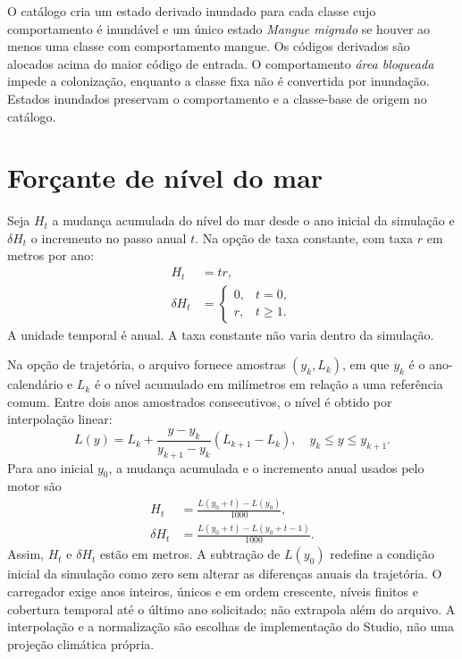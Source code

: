 \documentclass[11pt,a4paper]{article}
\begin{document}
O catálogo cria um estado derivado inundado para cada classe cujo comportamento é inundável e um único estado \textit{Mangue migrado} se houver ao menos uma classe com comportamento mangue. Os códigos derivados são alocados acima do maior código de entrada. O comportamento \textit{área bloqueada} impede a colonização, enquanto a classe fixa não é convertida por inundação. Estados inundados preservam o comportamento e a classe-base de origem no catálogo.

\section{Forçante de nível do mar}

Seja $H_t$ a mudança acumulada do nível do mar desde o ano inicial da simulação e $\delta H_t$ o incremento no passo anual $t$. Na opção de taxa constante, com taxa $r$ em metros por ano:
\begin{align}
H_t &= t r, \label{eq:constant-cumulative}\\
\delta H_t &= 
\begin{cases}
0, & t=0,\\
r, & t\geq 1.
\end{cases} \label{eq:constant-increment}
\end{align}
A unidade temporal é anual. A taxa constante não varia dentro da simulação.

Na opção de trajetória, o arquivo fornece amostras $(y_k,L_k)$, em que $y_k$ é o ano-calendário e $L_k$ é o nível acumulado em milímetros em relação a uma referência comum. Entre dois anos amostrados consecutivos, o nível é obtido por interpolação linear:
\begin{equation}
L(y)=L_k+
\frac{y-y_k}{y_{k+1}-y_k}(L_{k+1}-L_k),
\quad y_k\leq y\leq y_{k+1}.
\label{eq:linear-interpolation}
\end{equation}
Para ano inicial $y_0$, a mudança acumulada e o incremento anual usados pelo motor são
\begin{align}
H_t &= \frac{L(y_0+t)-L(y_0)}{1000}, \label{eq:trajectory-cumulative}\\
\delta H_t &= \frac{L(y_0+t)-L(y_0+t-1)}{1000}. \label{eq:trajectory-increment}
\end{align}
Assim, $H_t$ e $\delta H_t$ estão em metros. A subtração de $L(y_0)$ redefine a condição inicial da simulação como zero sem alterar as diferenças anuais da trajetória. O carregador exige anos inteiros, únicos e em ordem crescente, níveis finitos e cobertura temporal até o último ano solicitado; não extrapola além do arquivo. A interpolação e a normalização são escolhas de implementação do Studio, não uma projeção climática própria.
\end{document}
